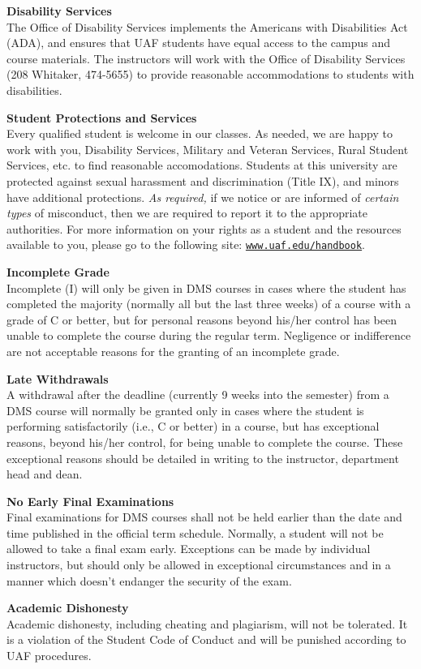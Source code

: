 \documentclass[12pt]{article}
\renewcommand{\emph}[1]{\textsf{\textbf{#1}}}
\newcommand{\localhead}[1]{\par\smallskip\textbf{#1}\nobreak\\}%
\def\subheading#1{\localhead{\emph{#1}}}
\begin{document}
\subheading{Disability Services}
The Office of Disability Services implements the
Americans with Disabilities Act (ADA), and ensures that UAF students
have equal access to the campus and course materials. The instructors will work with
the Office of Disability Services (208 Whitaker, 474-5655) to provide
reasonable accommodations to students with disabilities.

\subheading{Student Protections and Services}
Every qualified student is welcome in our classes.  As needed, we are happy to work with you, Disability Services, Military and Veteran Services, Rural Student Services, etc. to find reasonable accomodations. Students at this university are protected against sexual harassment and discrimination (Title IX), and minors have additional protections. \textit{As required,} if we notice or are informed of \textit{certain types} of misconduct, then we are required to report it to the appropriate authorities.  For more information on your rights as a student and the resources available to you, please go to the following site: \href{https://www.uaf.edu/handbook/}{\texttt{www.uaf.edu/handbook}}.

\subheading{Incomplete Grade} 
Incomplete (I) will only be given in DMS courses in cases where the student has completed the majority (normally all but the last three weeks) of a course with a grade of C or better, but for personal reasons beyond his/her control has been unable to complete the course during the regular term. Negligence or indifference are not acceptable reasons for the granting of an incomplete grade. 

\subheading{Late Withdrawals} 
A withdrawal after the deadline (currently 9 weeks into the semester) from a DMS course will normally be granted only in cases where the student is performing satisfactorily (i.e., C or better) in a course, but has exceptional reasons, beyond his/her control, for being unable to complete the course. These exceptional reasons should be detailed in writing to the instructor, department head and dean.

\subheading{No Early Final Examinations}
Final examinations for DMS courses shall not be held earlier than the date and time published in the official term schedule. Normally, a student will not be allowed to take a final exam early. Exceptions can be made by individual instructors, but should only be allowed in exceptional circumstances and in a manner which doesn't endanger the security of the exam.

\subheading{Academic Dishonesty}
Academic dishonesty, including cheating and plagiarism, will not be tolerated.  It is a violation of the Student Code of Conduct and will be punished according to UAF procedures.
\end{document}
